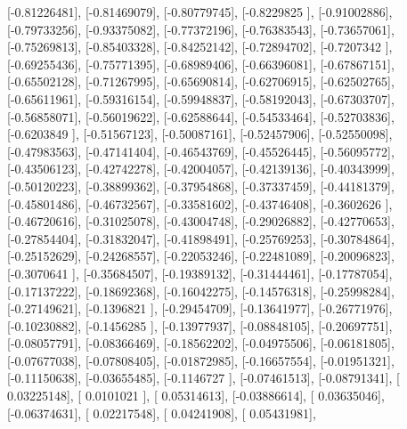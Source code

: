 \documentclass{article}
\begin{document}
       [-0.81226481],
       [-0.81469079],
       [-0.80779745],
       [-0.8229825 ],
       [-0.91002886],
       [-0.79733256],
       [-0.93375082],
       [-0.77372196],
       [-0.76383543],
       [-0.73657061],
       [-0.75269813],
       [-0.85403328],
       [-0.84252142],
       [-0.72894702],
       [-0.7207342 ],
       [-0.69255436],
       [-0.75771395],
       [-0.68989406],
       [-0.66396081],
       [-0.67867151],
       [-0.65502128],
       [-0.71267995],
       [-0.65690814],
       [-0.62706915],
       [-0.62502765],
       [-0.65611961],
       [-0.59316154],
       [-0.59948837],
       [-0.58192043],
       [-0.67303707],
       [-0.56858071],
       [-0.56019622],
       [-0.62588644],
       [-0.54533464],
       [-0.52703836],
       [-0.6203849 ],
       [-0.51567123],
       [-0.50087161],
       [-0.52457906],
       [-0.52550098],
       [-0.47983563],
       [-0.47141404],
       [-0.46543769],
       [-0.45526445],
       [-0.56095772],
       [-0.43506123],
       [-0.42742278],
       [-0.42004057],
       [-0.42139136],
       [-0.40343999],
       [-0.50120223],
       [-0.38899362],
       [-0.37954868],
       [-0.37337459],
       [-0.44181379],
       [-0.45801486],
       [-0.46732567],
       [-0.33581602],
       [-0.43746408],
       [-0.3602626 ],
       [-0.46720616],
       [-0.31025078],
       [-0.43004748],
       [-0.29026882],
       [-0.42770653],
       [-0.27854404],
       [-0.31832047],
       [-0.41898491],
       [-0.25769253],
       [-0.30784864],
       [-0.25152629],
       [-0.24268557],
       [-0.22053246],
       [-0.22481089],
       [-0.20096823],
       [-0.3070641 ],
       [-0.35684507],
       [-0.19389132],
       [-0.31444461],
       [-0.17787054],
       [-0.17137222],
       [-0.18692368],
       [-0.16042275],
       [-0.14576318],
       [-0.25998284],
       [-0.27149621],
       [-0.1396821 ],
       [-0.29454709],
       [-0.13641977],
       [-0.26771976],
       [-0.10230882],
       [-0.1456285 ],
       [-0.13977937],
       [-0.08848105],
       [-0.20697751],
       [-0.08057791],
       [-0.08366469],
       [-0.18562202],
       [-0.04975506],
       [-0.06181805],
       [-0.07677038],
       [-0.07808405],
       [-0.01872985],
       [-0.16657554],
       [-0.01951321],
       [-0.11150638],
       [-0.03655485],
       [-0.1146727 ],
       [-0.07461513],
       [-0.08791341],
       [ 0.03225148],
       [ 0.0101021 ],
       [ 0.05314613],
       [-0.03886614],
       [ 0.03635046],
       [-0.06374631],
       [ 0.02217548],
       [ 0.04241908],
       [ 0.05431981],
\end{document}
